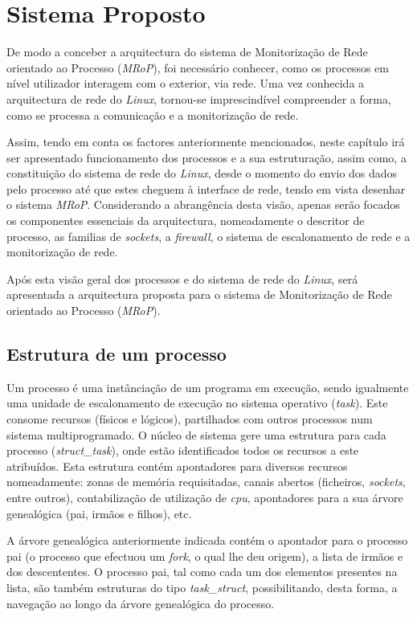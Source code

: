 \chapter{Sistema Proposto}
\label{cap:Estrutura}

De modo a conceber a arquitectura do sistema de Monitorização de Rede orientado ao Processo (\textit{MRoP}), foi necessário conhecer, como os processos em nível utilizador interagem com o exterior, via rede.
Uma vez conhecida a arquitectura de rede do \textit{Linux}, tornou-se imprescindível compreender a forma, como se processa a comunicação e a monitorização de rede.

Assim, tendo em conta os factores anteriormente mencionados, neste capítulo irá ser apresentado funcionamento dos processos e a sua estruturação, assim como, a constituição do sistema de rede do \textit{Linux}, desde o momento do envio dos dados pelo processo até que estes cheguem à interface de rede, tendo em vista desenhar o sistema \textit{MRoP}.
Considerando a abrangência desta visão, apenas serão focados os componentes essenciais da arquitectura, nomeadamente o descritor de processo, as familias de \textit{sockets}, a \textit{firewall}, o sistema de escalonamento de rede e a monitorização de rede.

Após esta visão geral dos processos e do sistema de rede do \textit{Linux}, será apresentada a arquitectura proposta para o sistema de Monitorização de Rede orientado ao Processo (\textit{MRoP}).

\section{Estrutura de um processo}

Um processo é uma instânciação de um programa em execução, sendo igualmente uma unidade de escalonamento de execução no sistema operativo (\textit{task}).
Este consome recursos (físicos e lógicos), partilhados com outros processos num sistema multiprogramado.
O núcleo de sistema gere uma estrutura para cada processo (\textit{struct\_task}), onde estão identificados todos os recursos a este atribuídos.
Esta estrutura contém apontadores para diversos recursos nomeadamente: zonas de memória requisitadas, canais abertos (ficheiros, \textit{sockets}, entre outros), contabilização de utilização de \textit{cpu}, apontadores para a sua árvore genealógica (pai, irmãos e filhos), etc.\cite{LKI, LKP}

A árvore genealógica anteriormente indicada contém o apontador para o processo pai (o processo que efectuou um \textit{fork}, o qual lhe deu origem), a lista de irmãos e dos descententes.
O processo pai, tal como cada um dos elementos presentes na lista, são também estruturas do tipo \textit{task\_struct}, possibilitando, desta forma, a navegação ao longo da árvore genealógica do processo.

